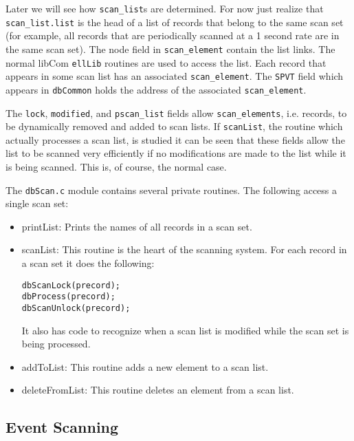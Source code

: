 Later we will see how \verb|scan_list|s are determined.
For now just realize that \verb|scan_list.list| is the head of a list of records that belong to the same scan set (for example, all records that are periodically scanned at a 1 second rate are in the same scan set).
The node field in \verb|scan_element| contain the list links.
The normal libCom \verb|ellLib| routines are used to access the list.
Each record that appears in some scan list has an associated \verb|scan_element|.
The \verb|SPVT| field which appears in \verb|dbCommon| holds the address of the associated \verb|scan_element|.

The \verb|lock|, \verb|modified|, and \verb|pscan_list| fields allow \verb|scan_elements|, i.e. records, to be dynamically removed and added to scan lists.
If \verb|scanList|, the routine which actually processes a scan list, is studied it can be seen that these fields allow the list to be scanned very efficiently if no modifications are made to the list while it is being scanned.
This is, of course, the normal case.

The \verb|dbScan.c| module contains several private routines. The following access a single scan set: 

\begin{itemize}
\item printList: Prints the names of all records in a scan set.

\item scanList: This routine is the heart of the scanning system.
For each record in a scan set it does the following:

\begin{verbatim}
dbScanLock(precord);
dbProcess(precord);
dbScanUnlock(precord);
\end{verbatim}

It also has code to recognize when a scan list is modified while the scan set is being processed.

\item addToList: This routine adds a new element to a scan list.

\item deleteFromList: This routine deletes an element from a scan list.

\end{itemize}

\subsection{Event Scanning}

